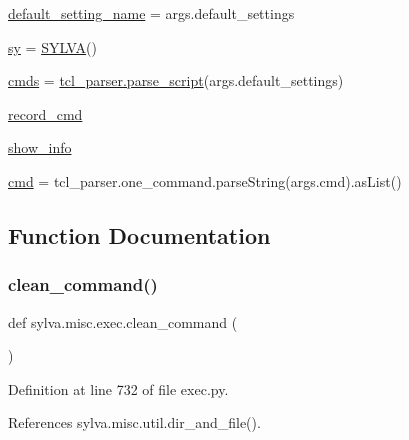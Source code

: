 \begin{DoxyCompactItemize}
\item 
\hyperlink{namespacesylva_1_1misc_1_1exec_a891749b8d985a498eae349a322db6717}{default\+\_\+setting\+\_\+name} = args.\+default\+\_\+settings
\item 
\hyperlink{namespacesylva_1_1misc_1_1exec_a7e1290d4d20b3d0e4d61c95571edda24}{sy} = \hyperlink{classsylva_1_1misc_1_1exec_1_1_s_y_l_v_a}{S\+Y\+L\+VA}()
\item 
\hyperlink{namespacesylva_1_1misc_1_1exec_a4c36666d7d4852a6684f769a8bc916f4}{cmds} = \hyperlink{namespacesylva_1_1misc_1_1tcl__parser_aab59812e931f24c8e7d1cbffd2fe587e}{tcl\+\_\+parser.\+parse\+\_\+script}(args.\+default\+\_\+settings)
\item 
\hyperlink{namespacesylva_1_1misc_1_1exec_a020e4ddb64c1ddaf08c5d43dc33b1a6f}{record\+\_\+cmd}
\item 
\hyperlink{namespacesylva_1_1misc_1_1exec_a887473109a0bd4665bac834e1a34eec0}{show\+\_\+info}
\item 
\hyperlink{namespacesylva_1_1misc_1_1exec_a49db5f46508c96872b9fd91c17271a25}{cmd} = tcl\+\_\+parser.\+one\+\_\+command.\+parse\+String(args.\+cmd).as\+List()
\end{DoxyCompactItemize}


\subsection{Function Documentation}
\mbox{\label{namespacesylva_1_1misc_1_1exec_a57af053cb45645bf285643c3a4f449f4}} 
\subsubsection{\texorpdfstring{clean\+\_\+command()}{clean\_command()}}
{\footnotesize\ttfamily def sylva.\+misc.\+exec.\+clean\+\_\+command (\begin{DoxyParamCaption}{ }\end{DoxyParamCaption})}



Definition at line 732 of file exec.\+py.



References sylva.\+misc.\+util.\+dir\+\_\+and\+\_\+file().


